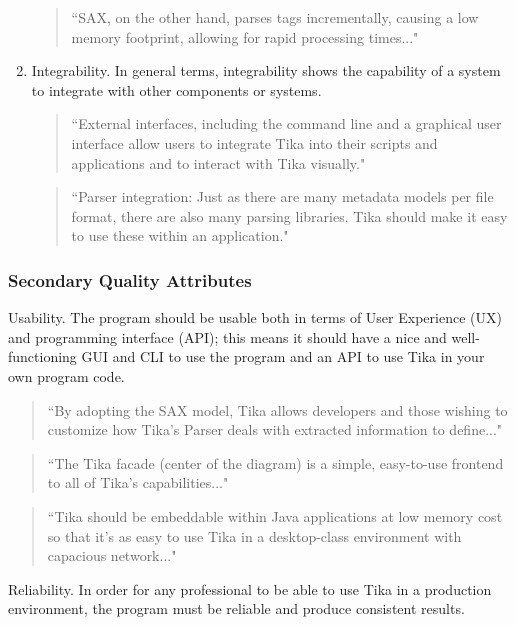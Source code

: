 \documentclass{article}
\begin{document}
\begin{enumerate}
    \begin{quote}
        ``SAX, on the other hand, parses tags incrementally, causing a low memory footprint, allowing for rapid processing times..."     \end{quote}
    
    \item Integrability. In general terms, integrability shows the capability of a system to integrate with other components or systems. 
    
    \begin{quote}
        ``External interfaces, including the command line and a graphical user interface allow users to integrate Tika into their scripts and applications and to interact with Tika visually."
    \end{quote}
    
    \begin{quote}
        ``Parser integration: Just as there are many metadata models per file format, there are also many parsing libraries. Tika should make it easy to use these within an application."
    \end{quote}
    
\end{enumerate}
\subsubsection{Secondary Quality Attributes}
 \item Usability. The program should be usable both in terms of User Experience (UX) and programming interface (API); this means it should have a nice and well-functioning GUI and CLI to use the program and an API to use Tika in your own program code.
    
    \begin{quote}
        ``By adopting the SAX model, Tika allows developers and those wishing to customize how Tika’s Parser deals with extracted information to define..."
    \end{quote}
    
    \begin{quote}
        ``The Tika facade (center of the diagram) is a simple, easy-to-use frontend to all of Tika’s capabilities..."
    \end{quote}
     
    \begin{quote}
        ``Tika should be embeddable within Java applications at low memory cost so that it’s as easy to use Tika in a desktop-class environment with capacious network..."
    \end{quote}
 \item Reliability. In order for any professional to be able to use Tika in a production environment, the program must be reliable and produce consistent results.
 
\end{document}

